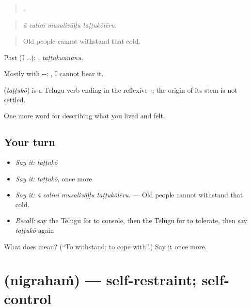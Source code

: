 \begin{quote}
   .
\end{quote}

\begin{quote}
\emph{ā calini musalivāḷḷu taṭṭukōlēru.}
\end{quote}

\begin{quote}
Old people cannot withstand that cold.
\end{quote}

Past (I …): , \emph{taṭṭukunnānu}.

Mostly with --: , I cannot bear it.

\begin{cousinweb}
\textbf{} (\emph{taṭṭukō}) is a Telugu verb ending in the reflexive -; the origin of its stem is not settled.
\end{cousinweb}

\begin{grammarlens}[title={What you've built}]
One more word for describing what you lived and felt.
\end{grammarlens}

\subsection*{Your turn}
\begin{itemize}
\raggedright
  \item \emph{Say it:} \emph{taṭṭukō}
  \item \emph{Say it:} \emph{taṭṭukō}, once more
  \item \emph{Say it:} \emph{ā calini musalivāḷḷu taṭṭukōlēru.} — Old people cannot withstand that cold.
  \item \emph{Recall:} say the Telugu for to console, then the Telugu for to tolerate, then say \emph{taṭṭukō} again
\end{itemize}

\begin{tcolorbox}[breakable,colback=teal!4,colframe=teal!35!black,title={Before you move on}]
What does  mean? (\textquotedblleft{}To withstand; to cope with\textquotedblright{}.) Say it once more.
\end{tcolorbox}
\section[\texorpdfstring{\te{నిగ్రహం} (nigrahaṁ)}{నిగ్రహం (nigrahaṁ)}]{ (nigrahaṁ) — self-restraint; self-control}

